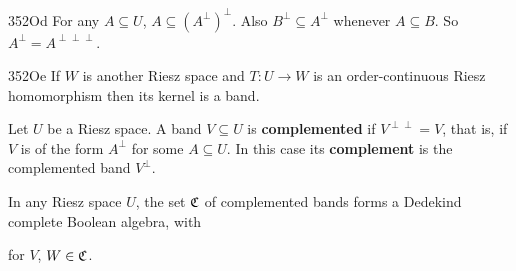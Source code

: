 \spheader 352Od For any $A\subseteq U$, $A\subseteq
(A^{\perp})^{\perp}$.   Also $B^{\perp}\subseteq A^{\perp}$ whenever
$A\subseteq B$.   So $A^{\perp}=A^{\perp\perp\perp}$.
     
\spheader 352Oe If $W$ is another Riesz space and $T:U\to W$ is an
order-continuous Riesz homomorphism then its kernel is a band.
     
 Let $U$ be a Riesz space.
A band $V\subseteq U$ is {\bf complemented} if $V^{\perp\perp}=V$, that
is, if $V$ is of the form $A^{\perp}$ for some
$A\subseteq U$.
In this case its {\bf complement} is the complemented band $V^{\perp}$.
     
 In any Riesz space $U$, the set $\frak C$ 
of complemented bands forms a Dedekind complete Boolean algebra, with
     
     
     
     
\noindent for $V$, $W\in\frak C$.
     
